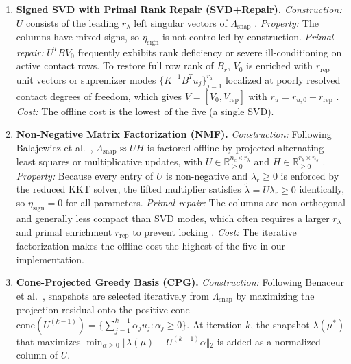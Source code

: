 \documentclass[11pt,a4paper]{article}
\begin{document}
\begin{enumerate}
\def\labelenumi{\arabic{enumi}.}
\item
  \textbf{Signed SVD with Primal Rank Repair (SVD+Repair).}
  \emph{Construction:} \(U\) consists of the leading \(r_\lambda\) left singular vectors of \(\Lambda_{\text{snap}}\) \cite{balajewicz2016projection, leberre2022condition}.
  \emph{Property:} The columns have mixed signs, so \(\eta_{\text{sign}}\) is not controlled by construction.
  \emph{Primal repair:} \(U^T B V_0\) frequently exhibits rank deficiency or severe ill-conditioning on active contact rows. To restore full row rank of \(B_r\), \(V_0\) is enriched with \(r_{\text{rep}}\) unit vectors or supremizer modes \(\{K^{-1} B^T u_j\}_{j=1}^{r_\lambda}\) localized at poorly resolved contact degrees of freedom, which gives \(V = [V_0, V_{\text{rep}}]\) with \(r_u = r_{u,0} + r_{\text{rep}}\) \cite{benaceur2020reduced, leberre2022condition}.
  \emph{Cost:} The offline cost is the lowest of the five (a single SVD).
\item
  \textbf{Non-Negative Matrix Factorization (NMF).}
  \emph{Construction:} Following Balajewicz et al.~\cite{balajewicz2016projection}, \(\Lambda_{\text{snap}} \approx U H\) is factored offline by projected alternating least squares or multiplicative updates, with \(U \in \mathbb{R}_{\ge 0}^{n_c \times r_\lambda}\) and \(H \in \mathbb{R}_{\ge 0}^{r_\lambda \times n_s}\) \cite{lee1999learning}.
  \emph{Property:} Because every entry of \(U\) is non-negative and \(\lambda_r \ge 0\) is enforced by the reduced KKT solver, the lifted multiplier satisfies \(\tilde{\lambda} = U \lambda_r \ge 0\) identically, so \(\eta_{\text{sign}} = 0\) for all parameters.
  \emph{Primal repair:} The columns are non-orthogonal and generally less compact than SVD modes, which often requires a larger \(r_\lambda\) and primal enrichment \(r_{\text{rep}}\) to prevent locking \cite{balajewicz2016projection, leberre2022condition}.
  \emph{Cost:} The iterative factorization makes the offline cost the highest of the five in our implementation.
\item
  \textbf{Cone-Projected Greedy Basis (CPG).}
  \emph{Construction:} Following Benaceur et al.~\cite{benaceur2020reduced}, snapshots are selected iteratively from \(\Lambda_{\text{snap}}\) by maximizing the projection residual onto the positive cone \(\text{cone}(U^{(k-1)}) = \{ \sum_{j=1}^{k-1} \alpha_j u_j : \alpha_j \ge 0 \}\). At iteration \(k\), the snapshot \(\lambda(\mu^*)\) that maximizes \(\min_{\alpha \ge 0} \Vert{}\lambda(\mu) - U^{(k-1)} \alpha\Vert{}_2\) is added as a normalized column of \(U\).

\end{enumerate}
\end{document}
